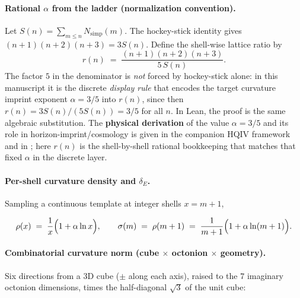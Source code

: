 \documentclass[11pt,a4paper]{article}
\theoremstyle{remark}
\begin{document}
\paragraph{Rational $\alpha$ from the ladder (normalization convention).}
Let $S(n)=\sum_{m\le n}N_{\mathrm{simp}}(m)$. The hockey-stick identity gives $(n+1)(n+2)(n+3)=3S(n)$. Define the shell-wise lattice ratio by
\begin{equation}
  r(n) \;=\; \frac{(n+1)(n+2)(n+3)}{5\,S(n)}.
\end{equation}
The factor $5$ in the denominator is \emph{not} forced by hockey-stick alone: in this manuscript it is the discrete \emph{display rule} that encodes the target curvature imprint exponent $\alpha=3/5$ into $r(n)$, since then $r(n)=3S(n)/(5S(n))=3/5$ for all $n$. In Lean, the proof is the same algebraic substitution. The \textbf{physical derivation} of the value $\alpha=3/5$ and its role in horizon-imprint/cosmology is given in the companion HQIV framework \cite{ettinger2026hqiv} and in \cite{brodie2026}; here $r(n)$ is the shell-by-shell rational bookkeeping that matches that fixed $\alpha$ in the discrete layer.

\paragraph{Per-shell curvature density and $\delta_E$.}
Sampling a continuous template at integer shells $x=m+1$,

\begin{equation}
  \rho(x) \;=\; \frac{1}{x}\Bigl(1+\alpha\ln x\Bigr),
  \qquad
  \sigma(m) \;=\; \rho(m+1) \;=\; \frac{1}{m+1}\Bigl(1+\alpha\ln(m+1)\Bigr).
\end{equation}

\paragraph{Combinatorial curvature norm (cube $\times$ octonion $\times$ geometry).}
Six directions from a $3$D cube ($\pm$ along each axis), raised to the $7$ imaginary octonion dimensions, times the half-diagonal $\sqrt{3}$ of the unit cube:
\end{document}
